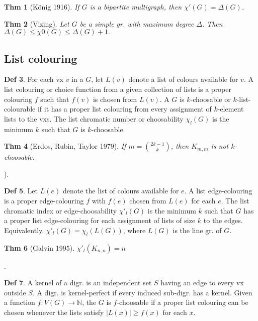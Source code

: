 \documentclass[11pt, fleqn, a4paper, landscape]{article}
\theoremstyle{plain} %
\newtheorem{thm}{Thm}
\theoremstyle{remark} %
\theoremstyle{definition} %
\newtheorem{defi}[thm]{Def}
\begin{document}
\begin{multicols}{5}
\begin{thm}[König 1916]
If $G$ is a bipartite multigraph, then $\chi'(G) = \Delta(G)$.
\end{thm}

\begin{thm}[Vizing]
Let $G$ be a simple gr. with maximum degree $\Delta$. Then $\Delta(G)\le \chi0(G) \le \Delta(G) + 1.$
\end{thm}
\addtocounter{thm}{1}

\subsection{List colouring}

\begin{defi}
For each vx $v$ in a $G$, let $L(v)$ denote a list of colours available for $v$. A list colouring or choice function from a given collection of lists is a proper colouring $f$ such that $f(v)$ is chosen from $L(v)$. A $G$ is $k$-choosable or $k$-list-colourable if it has a proper list colouring from every assignment of $k$-element lists to the vxs. The list chromatic number or choosability $\chi_l(G)$ is the minimum $k$ such that $G$ is $k$-choosable.
\end{defi}

\begin{thm}[Erdos, Rubin, Taylor 1979]
If $m = \binom{2k-1}{k}$, then $K_{m,m}$ is not $k$-choosable.
\end{thm}). 

\begin{defi}
Let $L(e)$ denote the list of colours available for $e$. A list edge-colouring is a proper edge-colouring $f$ with $f(e)$ chosen from $L(e)$ for each $e$. The list chromatic index or edge-choosability $\chi'_l(G)$ is the minimum $k$ such that $G$ has a proper list edge-colouring for each assignment of lists of size $k$ to the edges. Equivalently, $\chi'_l(G) = \chi_l(L(G))$, where $L(G)$ is the line gr. of $G$.
\end{defi}
\addtocounter{thm}{1}
\begin{thm}[Galvin 1995]
$\chi'_l(K_{n,n}) = n$
\end{thm}.

\begin{defi}
A kernel of a digr. is an independent set $S$ having an edge to every vx
outside $S$. A digr. is kernel-perfect if every induced sub-digr. has a kernel. Given a function $f : V (G) \to \mathbb{N}$, the $G$ is $f$-choosable if a proper list colouring can be chosen whenever the lists
satisfy $|L(x)|\ge f(x)$ for each $x$.
\end{defi}


\end{multicols}
\end{document}
